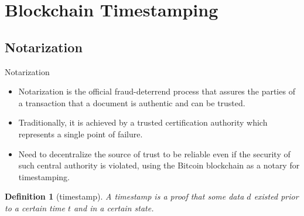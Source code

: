 \documentclass[usenames,dvipsnames]{beamer}
\newtheorem{mydef}{\alert{Definition}}[section]
\begin{document}
    \section{Blockchain Timestamping}
    \subsection{Notarization}
    \begin{frame}{Notarization}
    \begin{itemize}
        \item \alert{Notarization} is the official fraud-deterrend process that assures the parties of a transaction that a document is \alert{authentic} and can be \alert{trusted}.
        \item Traditionally, it is achieved by a trusted certification authority which represents a \alert{single point of failure}.
        \item Need to \alert{decentralize} the source of trust to be reliable even if the security of such central authority is violated, using the Bitcoin blockchain as a \alert{notary} for \alert{timestamping}.
        \end{itemize}
        \begin{mydef}[timestamp]
            A timestamp is a proof that some data $d$ existed prior to a certain time $t$ and in a certain state.
        \end{mydef}
    \end{frame}
    
\end{document}
